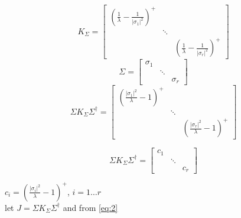 \documentclass[conference]{IEEEtran}
\begin{document}
\begin{equation*}
	K_\Sigma = \begin{bmatrix}
					\left(\frac{1}{\lambda}-\frac{1}{|\sigma_1|^2}\right)^+  & &\\
					& \ddots &\\
				& & \left(\frac{1}{\lambda}-\frac{1}{|\sigma_r|^2}\right)^+
			   \end{bmatrix}
\end{equation*}
\begin{equation*}
\Sigma = \begin{bmatrix}
	\sigma_1  & &\\
	& \ddots &\\
	& & \sigma_r
\end{bmatrix}
\end{equation*}
\begin{equation} \label{eq:5}
\Sigma K_\Sigma\Sigma^{\dagger} = \begin{bmatrix}
	\left(\frac{|\sigma_1|^2}{\lambda}-1\right)^+ & &\\
	& \ddots &\\
	& & \left(\frac{|\sigma_r|^2}{\lambda}-1\right)^+
\end{bmatrix}
\end{equation}




\begin{equation*} \label{eq:6}
\Sigma K_{\Sigma} \Sigma^{\dagger} = \begin{bmatrix}
	c_1  & &\\
	& \ddots &\\
	& & c_r
\end{bmatrix}
\end{equation*}

$c_i = \left(\frac{|\sigma_i|^2}{\lambda}-1\right)^+$, $i = 1 \ldots r$\\
let $J  = \Sigma K_{\Sigma} \Sigma^{\dagger}$ and from \ref{eq:2}
\end{document}
